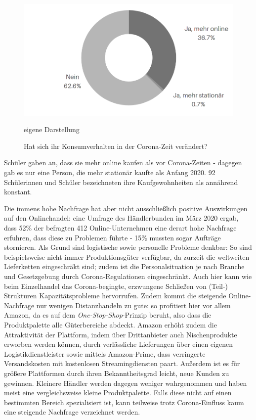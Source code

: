 \begin{folding}
\begin{figure}[H]
    \begin{center}
        \includegraphics[width=12cm]{media/schuelerumfrage/14.png}
        \caption{Hat sich ihr Konsumverhalten in der Corona-Zeit verändert?}
        \label{umfrage-konsum}
        \bildquelle eigene Darstellung
    \end{center}
\end{figure}

 Schüler gaben an, dass sie mehr online kaufen als vor Corona-Zeiten - dagegen gab es nur eine Person, die mehr stationär kaufte als Anfang 2020. 92 Schülerinnen und Schüler bezeichneten ihre Kaufgewohnheiten als annährend konstant.


Die immens hohe Nachfrage hat aber nicht ausschließlich positive Auswirkungen auf den Onlinehandel: eine Umfrage des Händlerbunden im März 2020 ergab, dass 52\% der befragten 412 Online-Unternehmen eine derart hohe Nachfrage erfuhren, dass diese zu Problemen führte - 15\% mussten sogar Aufträge stornieren. Als Grund sind logistische sowie personelle Probleme denkbar: So sind beispielsweise nicht immer Produktionsgüter verfügbar, da zurzeit die weltweiten Lieferketten eingeschräkt sind\cite{corona-wettbewerb}; zudem ist die Personalsituation je nach Branche und Gesetzgebung durch Corona-Regulationen eingeschränkt\cite{haendlerbund-studie}. Auch hier kann wie beim Einzelhandel das Corona-begingte, erzwungene Schließen von (Teil-) Strukturen Kapazitätsprobleme hervorrufen. Zudem kommt die steigende Online-Nachfrage nur wenigen Distanzhandeln zu gute: so profitiert hier vor allem Amazon, da es auf dem \emph{One-Stop-Shop}-Prinzip beruht, also dass die Produktpalette alle Güterbereiche abdeckt. Amazon erhöht zudem die Attraktivität der Plattform, indem über Drittanbieter auch Nischenprodukte erworben werden können, durch verlässliche Lieferungen über einen eigenen Logistikdienstleister sowie mittels Amazon-Prime, dass verringerte Versandskosten mit kostenlosen Streamingdiensten paart. Außerdem ist es für größere Plattformen durch ihren Bekanntheitsgrad leicht, neue Kunden zu gewinnen. Kleinere Händler werden dagegen weniger wahrgenommen und haben meist eine vergleichsweise kleine Produktpalette. Falls diese nicht auf einen bestimmten Bereich spezialisiert ist, kann teilweise trotz Corona-Einfluss kaum eine steigende Nachfrage verzeichnet werden\cite{corona-amazon}.


\end{folding}
